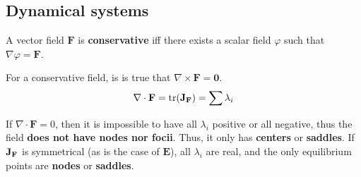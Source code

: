 \documentclass{form}
\begin{document}
\begin{multicols}{2}
\section*{Dynamical systems}
A vector field $\mathbf{F}$ is \textbf{conservative} iff there exists a scalar field $\varphi$ such that $\nabla \varphi = \mathbf{F}$. \par
For a conservative field, is is true that $\nabla \times \mathbf{F} = \mathbf{0}$.
\begin{equation*}
\nabla \cdot \mathbf{F} = \operatorname{tr}(\mathbf{J}_{\mathbf{F}}) = \sum{\lambda_i}
\end{equation*}\par
If $\nabla \cdot \mathbf{F}=0$, then it is impossible to have all $\lambda_i$ positive or all negative, thus the field \textbf{does not have nodes nor focii}.
Thus, it only has \textbf{centers} or \textbf{saddles}.
If $\mathbf{J}_\mathbf{F}$ is symmetrical (as is the case of $\mathbf{E}$), all $\lambda_i$ are real, and the only equilibrium points are \textbf{nodes} or \textbf{saddles}.
\end{multicols}
\end{document}
